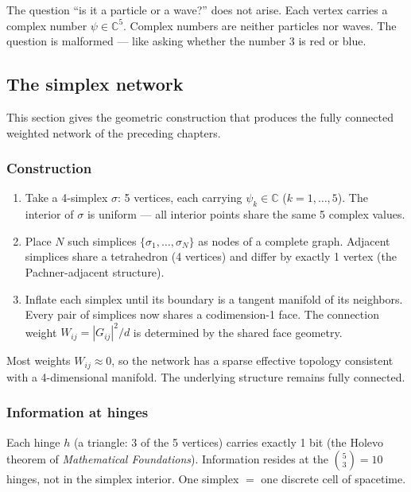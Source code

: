 \documentclass[12pt]{article}
\theoremstyle{remark}
\theoremstyle{definition}
\newcommand{\CC}{\mathbb{C}}
\begin{document}
The question ``is it a particle or a wave?'' does not arise. Each vertex carries a complex number $\psi \in \CC^5$. Complex numbers are neither particles nor waves. The question is malformed --- like asking whether the number 3 is red or blue.

\subsection{The simplex network}

This section gives the geometric construction that produces the fully connected weighted network of the preceding chapters.

\subsubsection{Construction}

\begin{enumerate}
\item Take a 4-simplex $\sigma$: 5 vertices, each carrying $\psi_k \in \CC$ ($k = 1, \ldots, 5$). The interior of $\sigma$ is uniform --- all interior points share the same 5 complex values.

\item Place $N$ such simplices $\{\sigma_1, \ldots, \sigma_N\}$ as nodes of a complete graph. Adjacent simplices share a tetrahedron (4 vertices) and differ by exactly 1 vertex (the Pachner-adjacent structure).

\item Inflate each simplex until its boundary is a tangent manifold of its neighbors. Every pair of simplices now shares a codimension-1 face. The connection weight $W_{ij} = |G_{ij}|^2/d$ is determined by the shared face geometry.
\end{enumerate}

Most weights $W_{ij} \approx 0$, so the network has a sparse effective topology consistent with a 4-dimensional manifold. The underlying structure remains fully connected.

\subsubsection{Information at hinges}

Each hinge $h$ (a triangle: 3 of the 5 vertices) carries exactly 1 bit (the Holevo theorem of \textit{Mathematical Foundations}). Information resides at the $\binom{5}{3} = 10$ hinges, not in the simplex interior. One simplex $=$ one discrete cell of spacetime.
\end{document}
